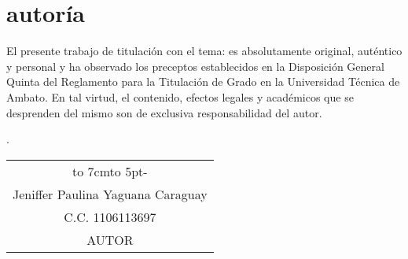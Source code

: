 \chapter*{autoría}
El presente trabajo de titulaci\'on con el tema: {\MakeUppercase\tema} es absolutamente original, auténtico y personal y ha observado
los preceptos establecidos en la Disposición General Quinta del Reglamento para la
Titulación de Grado en la Universidad Técnica de Ambato. En tal virtud, el contenido,
efectos legales y académicos que se desprenden del mismo son de exclusiva
responsabilidad del autor.\begin{flushright}
	\lugarFechaPrelims.
\end{flushright}

\vspace*{5cm}
\begin{center}
	\begin{tabular}{c}
		\hbox to 7cm{\leaders\hbox to 5pt{\hss-\hss}\hfil} \\
		Jeniffer Paulina Yaguana Caraguay                    \\
		C.C. 1106113697                                      \\
		AUTOR
	\end{tabular}
\end{center}
